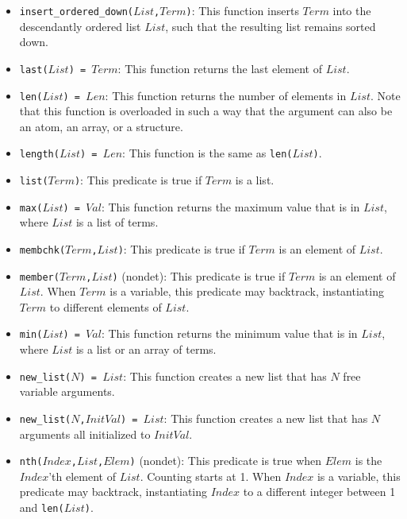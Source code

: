 \begin{itemize}
\item \texttt{insert\_ordered\_down($List$,$Term$)}: This function inserts $Term$ into the descendantly ordered list $List$, such that the resulting list remains sorted down.
\item \texttt{last($List$) = $Term$}: This function returns the last element of $List$. 
\item \texttt{len($List$) = $Len$}: This function returns the number of elements in $List$. Note that this function is overloaded in such a way that the argument can also be an atom, an array, or a structure.
\item \texttt{length($List$) = $Len$}: This function is the same as \texttt{len($List$)}.
\item \texttt{list($Term$)}: This predicate is true if $Term$ is a list.
\item \texttt{max($List$) = $Val$}: This function returns the maximum value that is in $List$, where $List$ is a list of terms. 
\item \texttt{membchk($Term$,$List$)}: This predicate is true if $Term$ is an element of $List$. 
\item \texttt{member($Term$,$List$)} (nondet): This predicate is true if $Term$ is an element of $List$.  When $Term$ is a variable, this predicate may backtrack, instantiating $Term$ to different elements of $List$.
\item \texttt{min($List$) = $Val$}: This function returns the minimum value that is in $List$, where $List$ is a list or an array of terms. 
\item \texttt{new\_list($N$) = $List$}: This function creates a new list that has $N$ free variable arguments. 
\item \texttt{new\_list($N$,$InitVal$) = $List$}: This function creates a new list that has $N$ arguments all initialized to $InitVal$. 

\item \texttt{nth($Index$,$List$,$Elem$)} (nondet): This predicate is true when $Elem$ is the $Index$'th element of $List$.  Counting starts at 1. When $Index$ is a variable, this predicate may backtrack, instantiating $Index$ to a different integer between 1 and \texttt{len($List$)}.


\end{itemize}
